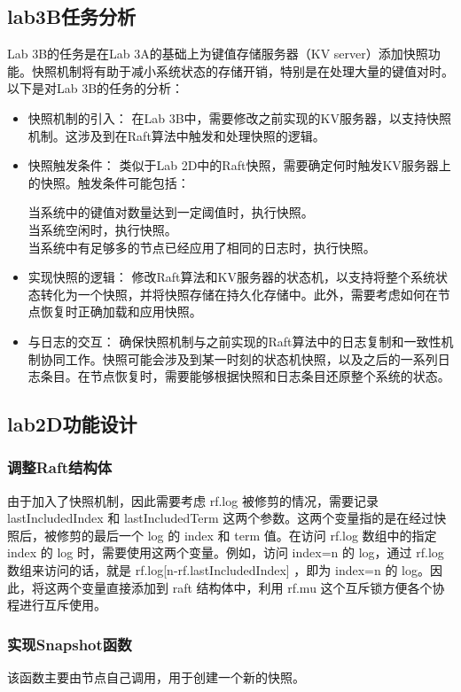 \documentclass[]{article}
\begin{document}
	\subsection{lab3B任务分析}
	Lab 3B的任务是在Lab 3A的基础上为键值存储服务器（KV server）添加快照功能。快照机制将有助于减小系统状态的存储开销，特别是在处理大量的键值对时。以下是对Lab 3B的任务的分析：
	\begin{itemize}
	\item 快照机制的引入： 在Lab 3B中，需要修改之前实现的KV服务器，以支持快照机制。这涉及到在Raft算法中触发和处理快照的逻辑。
	
	\item 快照触发条件： 类似于Lab 2D中的Raft快照，需要确定何时触发KV服务器上的快照。触发条件可能包括：
	
	当系统中的键值对数量达到一定阈值时，执行快照。\\
	当系统空闲时，执行快照。\\
	当系统中有足够多的节点已经应用了相同的日志时，执行快照。
	
	\item 实现快照的逻辑： 修改Raft算法和KV服务器的状态机，以支持将整个系统状态转化为一个快照，并将快照存储在持久化存储中。此外，需要考虑如何在节点恢复时正确加载和应用快照。
	
	\item 与日志的交互： 确保快照机制与之前实现的Raft算法中的日志复制和一致性机制协同工作。快照可能会涉及到某一时刻的状态机快照，以及之后的一系列日志条目。在节点恢复时，需要能够根据快照和日志条目还原整个系统的状态。
	\end{itemize}

	\subsection{lab2D功能设计}
	\subsubsection{调整Raft结构体}
	由于加入了快照机制，因此需要考虑 rf.log 被修剪的情况，需要记录 lastIncludedIndex 和 lastIncludedTerm 这两个参数。这两个变量指的是在经过快照后，被修剪的最后一个 log 的 index 和 term 值。在访问 rf.log 数组中的指定 index 的 log 时，需要使用这两个变量。例如，访问 index=n 的 log，通过 rf.log 数组来访问的话，就是 rf.log[n-rf.lastIncludedIndex] ，即为 index=n 的 log。因此，将这两个变量直接添加到 raft 结构体中，利用 rf.mu 这个互斥锁方便各个协程进行互斥使用。
	\subsubsection{实现Snapshot函数}
	该函数主要由节点自己调用，用于创建一个新的快照。
	
\end{document}
